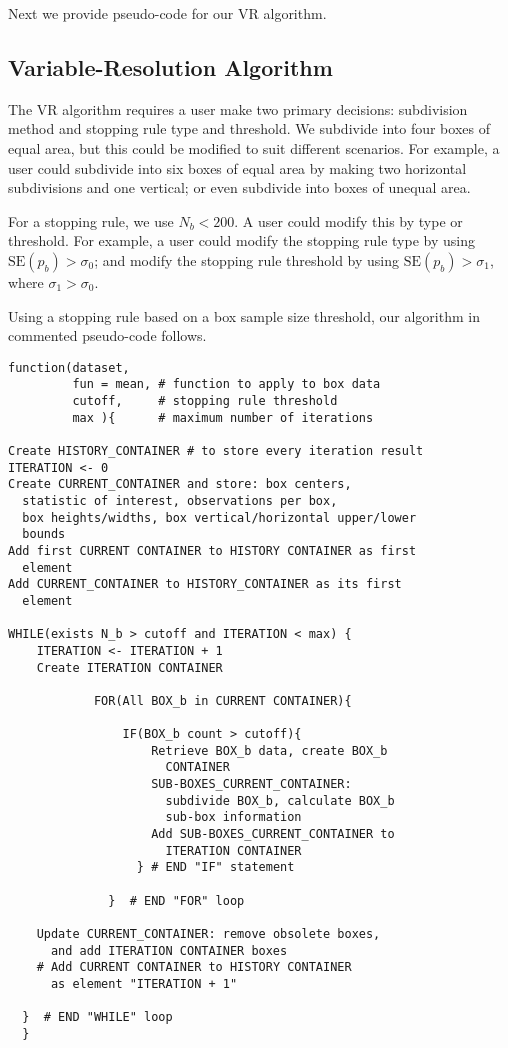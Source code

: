 Next we provide pseudo-code for our VR algorithm.
      	
\subsection{Variable-Resolution Algorithm}

The VR algorithm requires a user make two primary decisions: subdivision method and stopping rule type and threshold. We subdivide into four boxes of equal area, but this could be modified to suit different scenarios. For example, a user could subdivide into six boxes of equal area by making two horizontal subdivisions and one vertical; or even subdivide into boxes of unequal area.

For a stopping rule, we use $N_{b} < 200$. A user could modify this by type or threshold. For example, a user could modify the stopping rule type by using $\text{SE}(p_{b}) > \sigma_{0}$; and modify the stopping rule threshold by using $\text{SE}(p_{b}) > \sigma_{1}$, where $\sigma_{1} > \sigma_{0}$.

Using a stopping rule based on a box sample size threshold, our algorithm in commented pseudo-code follows.
\begin{verbatim}
function(dataset, 
         fun = mean, # function to apply to box data
         cutoff,     # stopping rule threshold
         max ){      # maximum number of iterations
         
Create HISTORY_CONTAINER # to store every iteration result
ITERATION <- 0              
Create CURRENT_CONTAINER and store: box centers, 
  statistic of interest, observations per box, 
  box heights/widths, box vertical/horizontal upper/lower 
  bounds
Add first CURRENT CONTAINER to HISTORY CONTAINER as first
  element
Add CURRENT_CONTAINER to HISTORY_CONTAINER as its first
  element

WHILE(exists N_b > cutoff and ITERATION < max) {
    ITERATION <- ITERATION + 1    
    Create ITERATION CONTAINER
            
            FOR(All BOX_b in CURRENT CONTAINER){
            
                IF(BOX_b count > cutoff){ 
                    Retrieve BOX_b data, create BOX_b
                      CONTAINER
                    SUB-BOXES_CURRENT_CONTAINER: 
                      subdivide BOX_b, calculate BOX_b 
                      sub-box information
                    Add SUB-BOXES_CURRENT_CONTAINER to
                      ITERATION CONTAINER  
                  } # END "IF" statement
                        
              }  # END "FOR" loop
              
    Update CURRENT_CONTAINER: remove obsolete boxes,
      and add ITERATION CONTAINER boxes
    # Add CURRENT CONTAINER to HISTORY CONTAINER 
      as element "ITERATION + 1"
            
  }  # END "WHILE" loop
  }

\end{verbatim}
      	
